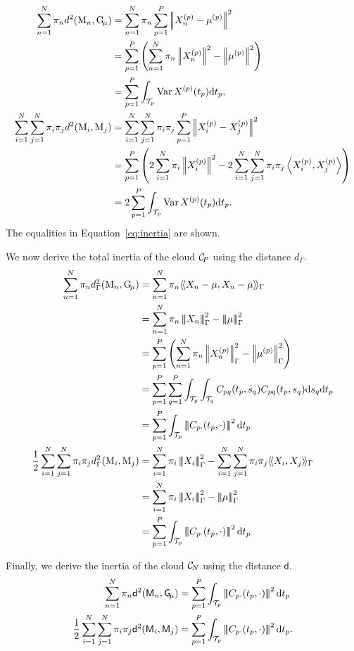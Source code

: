 \begin{align*}
    \sum_{n = 1}^N \pi_n d^2(\pobs{M}_n, \Gmu) 
    &= \sum_{n = 1}^N \pi_n \sum_{p = 1}^P\normLp{\Xnp - \mu^{(p)}}^2\\
    &= \sum_{p = 1}^P\left(\sum_{n = 1}^N \pi_n \normLp{\Xnp}^2 - \normLp{\mup{p}}^2\right) \\
    &= \sum_{p = 1}^P \int_{\TT{p}}\Var{\Xp{p}(t_p)} \dd t_p, \\
\sum_{i = 1}^N \sum_{j = 1}^N \pi_i \pi_j d^2(\pobs{M}_i, \pobs{M}_j) &= \sum_{i = 1}^N \sum_{j = 1}^N \pi_i \pi_j \sum_{p = 1}^P \normLp{\Xp{p}_i - \Xp{p}_j}^2\\
    &= \sum_{p = 1}^P \left(2\sum_{i = 1}^N \pi_i\normLp{\Xp{p}_i}^2 - 2\sum_{i = 1}^N \sum_{j = 1}^N \pi_i\pi_j\inLp{\Xp{p}_i}{\Xp{p}_j}\right) \\
    &= 2\sum_{p = 1}^P \int_{\TT{p}}\Var{\Xp{p}(t_p)} \dd t_p.
\end{align*}
The equalities in Equation~\eqref{eq:inertia} are shown.


We now derive the total inertia of the cloud $\mathcal{C}_{\!P}$ using the distance $d_\Gamma$.
\begin{align}
   \sum_{n = 1}^N \pi_n d_\Gamma^2(\pobs{M}_n, \Gmu) &= \sum_{n = 1}^N \pi_n \inHG{X_n - \mu}{X_n - \mu} \\
   &= \sum_{n = 1}^N \pi_n \normHG{X_n}^2 - \normHG{\mu}^2 \\
   &= \sum_{p = 1}^P \left(\sum_{n = 1}^N \pi_n \normLp{\Xnp}_{\Gamma}^2 - \normLp{\mup{p}}_{\Gamma}^2\right) \\
   &= \sum_{p = 1}^P \sum_{q = 1}^P \int_{\TT{p}} \int_{\TT{q}} C_{pq}(t_p, s_q)C_{pq}(t_p, s_q) \dd s_q \dd t_p \\
   &= \sum_{p = 1}^P \int_{\TT{p}} \normH{C_{p \cdot}(t_p, \cdot)}^2 \dd t_p \\
   \frac{1}{2}\sum_{i = 1}^N \sum_{j = 1}^N \pi_i \pi_j d_\Gamma^2(\pobs{M}_i, \pobs{M}_j)&= \sum_{i = 1}^N \pi_i \normHG{X_i}^2 - \sum_{i = 1}^N \sum_{j = 1}^N \pi_i\pi_j \inHG{X_i}{X_j} \\
    &= \sum_{i = 1}^N \pi_i \normHG{X_i}^2 - \normHG{\mu}^2 \\
    &= \sum_{p = 1}^P \int_{\TT{p}} \normH{C_{p \cdot}(t_p, \cdot)}^2 \dd t_p 
\end{align}

Finally, we derive the inertia of the cloud $\mathcal{C}_{\!N}$ using the distance $\mathsf{d}$.
\begin{align}
\sum_{n = 1}^N \pi_n \mathsf{d}^2(\pfea{M}_n, \Gfea) &= \sum_{p = 1}^P \int_{\TT{p}} \normH{C_{p \cdot}(t_p, \cdot)}^2 \dd t_p\\
\frac{1}{2}\sum_{i = 1}^N \sum_{j = 1}^N \pi_i \pi_j \mathsf{d}^2(\pfea{M}_i, \pfea{M}_j) &= \sum_{p = 1}^P \int_{\TT{p}} \normH{C_{p \cdot}(t_p, \cdot)}^2 \dd t_p.
\end{align}

